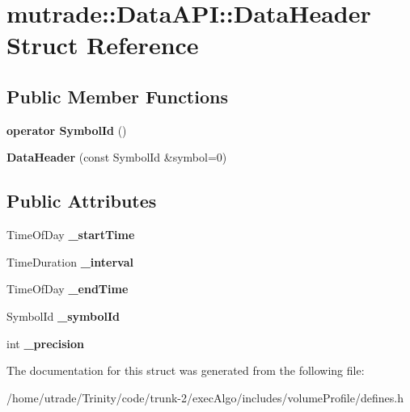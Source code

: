 \hypertarget{structmutrade_1_1_data_a_p_i_1_1_data_header}{\section{mutrade\-:\-:Data\-A\-P\-I\-:\-:Data\-Header Struct Reference}
\label{structmutrade_1_1_data_a_p_i_1_1_data_header}
}
\subsection*{Public Member Functions}
\begin{DoxyCompactItemize}
\item 
\hypertarget{structmutrade_1_1_data_a_p_i_1_1_data_header_a7b8d21a96aacd1c5a428e4d9e87c8afe}{{\bfseries operator Symbol\-Id} ()}\label{structmutrade_1_1_data_a_p_i_1_1_data_header_a7b8d21a96aacd1c5a428e4d9e87c8afe}

\item 
\hypertarget{structmutrade_1_1_data_a_p_i_1_1_data_header_ad0e012ba2e7abe586bca0f8b91d920d2}{{\bfseries Data\-Header} (const Symbol\-Id \&symbol=0)}\label{structmutrade_1_1_data_a_p_i_1_1_data_header_ad0e012ba2e7abe586bca0f8b91d920d2}

\end{DoxyCompactItemize}
\subsection*{Public Attributes}
\begin{DoxyCompactItemize}
\item 
\hypertarget{structmutrade_1_1_data_a_p_i_1_1_data_header_a4f5e46cf0fed81caaff223b2c5dd14eb}{Time\-Of\-Day {\bfseries \-\_\-start\-Time}}\label{structmutrade_1_1_data_a_p_i_1_1_data_header_a4f5e46cf0fed81caaff223b2c5dd14eb}

\item 
\hypertarget{structmutrade_1_1_data_a_p_i_1_1_data_header_ad452a2d841bf871ae0bc31b4e7981152}{Time\-Duration {\bfseries \-\_\-interval}}\label{structmutrade_1_1_data_a_p_i_1_1_data_header_ad452a2d841bf871ae0bc31b4e7981152}

\item 
\hypertarget{structmutrade_1_1_data_a_p_i_1_1_data_header_a5b940cd7d9a84c58f7c5da5c50b930de}{Time\-Of\-Day {\bfseries \-\_\-end\-Time}}\label{structmutrade_1_1_data_a_p_i_1_1_data_header_a5b940cd7d9a84c58f7c5da5c50b930de}

\item 
\hypertarget{structmutrade_1_1_data_a_p_i_1_1_data_header_afae806d43bb12af368d8b3f0543fe93f}{Symbol\-Id {\bfseries \-\_\-symbol\-Id}}\label{structmutrade_1_1_data_a_p_i_1_1_data_header_afae806d43bb12af368d8b3f0543fe93f}

\item 
\hypertarget{structmutrade_1_1_data_a_p_i_1_1_data_header_aabe50c6f258ac2a04c4b33bef9a57a84}{int {\bfseries \-\_\-precision}}\label{structmutrade_1_1_data_a_p_i_1_1_data_header_aabe50c6f258ac2a04c4b33bef9a57a84}

\end{DoxyCompactItemize}


The documentation for this struct was generated from the following file\-:\begin{DoxyCompactItemize}
\item 
/home/utrade/\-Trinity/code/trunk-\/2/exec\-Algo/includes/volume\-Profile/defines.\-h\end{DoxyCompactItemize}
